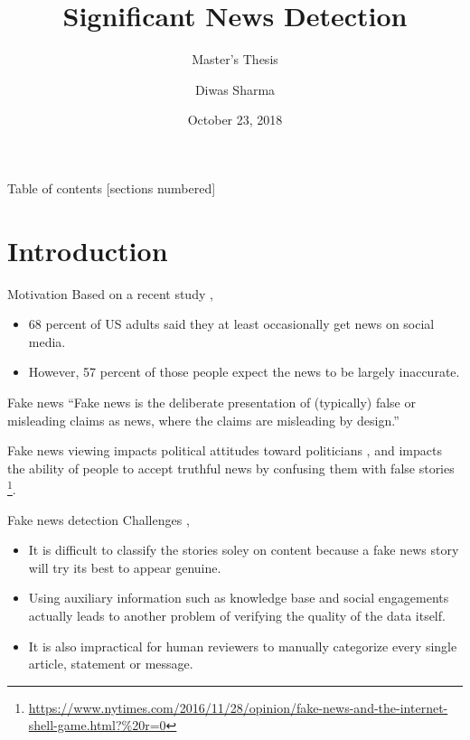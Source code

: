 \documentclass[12pt]{beamer}
\title{Significant News Detection}
\subtitle{Master's Thesis}
\date{October 23, 2018}
\author{Diwas Sharma}
\institute{The University of Alabama in Huntsville}
\begin{document}
\maketitle

\begin{frame}{Table of contents}
  [sections numbered]
  \tableofcontents[hideallsubsections]
\end{frame}

\section{Introduction}

\begin{frame}{Motivation}
    Based on a recent study \cite{matsa2018news},
    \begin{itemize}
        \item 68 percent of US adults said they at least occasionally get news on social media.
        \item However, 57 percent of those people expect the news to be largely inaccurate.
    \end{itemize}
\end{frame}

\begin{frame}{Fake news}
    \enquote{Fake news is the deliberate presentation of (typically) false or misleading claims as news, where the claims are misleading by design.} \cite{gelfert2018fake}

    Fake news viewing impacts political attitudes toward politicians \cite{balmas2014fake}, and impacts the ability of people to accept truthful news by confusing
    them with false stories \footnote{\url{https://www.nytimes.com/2016/11/28/opinion/fake-news-and-the-internet-shell-game.html?\%20r=0}}.
\end{frame}

\begin{frame}{Fake news detection}
Challenges \cite{shu2017fake},

\begin{itemize}
    \item It is difficult to classify the stories soley on content because a fake news story will try its best to appear genuine.
    \item Using auxiliary information such as knowledge base and social engagements actually leads to another problem of verifying
        the quality of the data itself.
    \item It is also impractical for human reviewers to manually categorize every single article, statement or message.
\end{itemize}

\end{frame}
\end{document}
